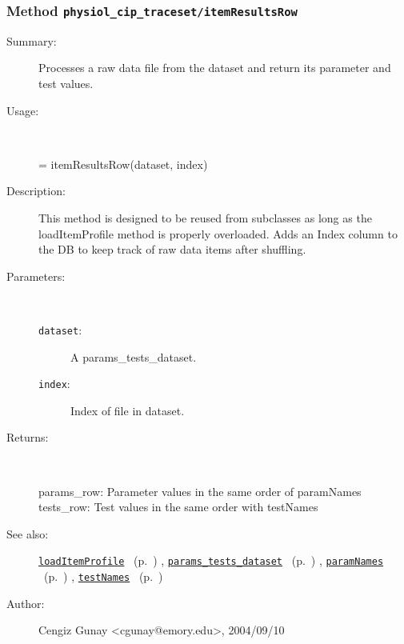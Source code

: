 \subsubsection[Method \texttt{itemResultsRow}]{Method \texttt{physiol\_cip\_traceset/itemResultsRow}}%
%
\label{ref_physiol_cip_traceset__itemResultsRow}%
\hypertarget{ref_physiol_cip_traceset__itemResultsRow}{}%
\begin{description}
\item[Summary:]Processes a raw data file from the dataset and return
		its parameter and test values.
%
\item[Usage:]~%
\begin{lyxcode}%
[params\_row, tests\_row] = itemResultsRow(dataset, index)
%
\end{lyxcode}%
%
\item[Description:]%
This method is designed to be reused from subclasses as long as the
 loadItemProfile method is properly overloaded. Adds an Index
 column to the DB to keep track of raw data items after shuffling.
\item[Parameters:]~
\begin{description}%
\item[\texttt{dataset}:]
 A params\_tests\_dataset.
\item[\texttt{index}:]
 Index of file in dataset.
\end{description}%
%
\item[Returns:
]~

	params\_row: Parameter values in the same order of paramNames
	tests\_row: Test values in the same order with testNames
%
%
\item[See also:]%
\hyperlink{ref_loadItemProfile}{\texttt{loadItemProfile}}%
\ (p.~\pageref{ref_loadItemProfile})%
%
, \hyperlink{ref_params_tests_dataset}{\texttt{params\_tests\_dataset}}%
\ (p.~\pageref{ref_params_tests_dataset})%
%
, \hyperlink{ref_paramNames}{\texttt{paramNames}}%
\ (p.~\pageref{ref_paramNames})%
%
, \hyperlink{ref_testNames}{\texttt{testNames}}%
\ (p.~\pageref{ref_testNames})%
%
%
\item[Author:]%
Cengiz Gunay <cgunay@emory.edu>, 2004/09/10
%
\end{description}
\methodline%

